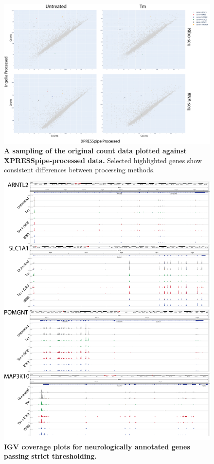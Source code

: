 \documentclass[10pt, oneside]{article}
\newcommand{\beginsupplement}{%
  \setcounter{table}{0}
  \renewcommand{\thetable}{S\arabic{table}}%
  \setcounter{figure}{0}
  \renewcommand{\thefigure}{S\arabic{figure}}%
}
\begin{document}



\beginsupplement

\begin{figure}
\centering
  \includegraphics[width=160mm]{figures/xpresspipe_supplement2.png}
  \caption{\textbf{A sampling of the original count data plotted against XPRESSpipe-processed data.} Selected highlighted genes show consistent differences between processing methods.}
  \label{fig:supplement2}
\end{figure}

\begin{figure}
\centering
  \includegraphics[width=180mm]{figures/xpresspipe_supplement3.png}
  \caption{\textbf{IGV coverage plots for neurologically annotated genes passing strict thresholding.}}
  \label{fig:supplement3}
\end{figure}
\end{document}
